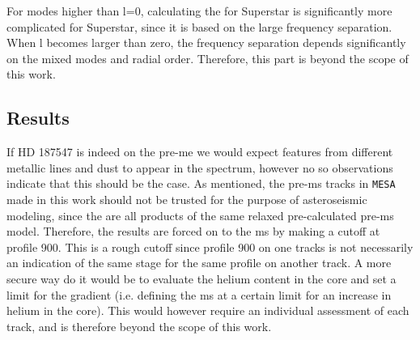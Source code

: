For modes higher than l=0, calculating the \chis for Superstar is significantly more complicated for Superstar, since it is based on the large frequency separation. When l becomes larger than zero, the frequency separation depends significantly on the mixed modes and radial order. Therefore, this part is beyond the scope of this work. 

\subsection{Results}
If HD 187547 is indeed on the pre-me we would expect features from different metallic lines and dust to appear in the spectrum, however no so observations indicate that this should be the case. As mentioned, the pre-ms tracks in \texttt{MESA} made in this work should not be trusted for  the purpose of asteroseismic modeling, since the are all products of the same relaxed pre-calculated pre-ms model. Therefore, the results are forced on to the ms by making a cutoff at profile 900. This is a rough cutoff since profile 900 on one tracks is not necessarily an indication of the same stage for the same profile on another track. A more secure way do it would be to evaluate the helium content in the core and set a limit for the gradient (i.e. defining the ms at a certain limit for an increase in helium in the core). This would however require an individual assessment of each track, and is therefore beyond the scope of this work. 

